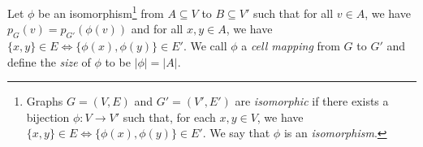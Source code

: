 \documentclass[a4paper,11pt]{article}
\begin{document}
%
%
%
%

Let $\phi$ be an isomorphism\footnote{Graphs $G = (V, E)$ and $G' = (V', E')$ are \textit{isomorphic} if there exists a bijection $\phi : V \rightarrow V'$ such that, for each $x, y \in V$, we have $\{ x, y \} \in E \Leftrightarrow \{ \phi(x), \phi(y) \} \in E'$. We say that $\phi$ is an \textit{isomorphism}.} from $A \subseteq V$ to $B \subseteq V'$ such that for all $v \in A$, we have $p_{G}(v) = p_{G'}(\phi(v))$ and for all $x, y \in A$, we have $\{ x, y \} \in E \Leftrightarrow \{ \phi(x), \phi(y) \} \in E'$. 
We call $\phi$ a \textit{cell mapping} from $G$ to $G'$ and define the \textit{size} of $\phi$ to be $|\phi| = |A|$.
\end{document}
